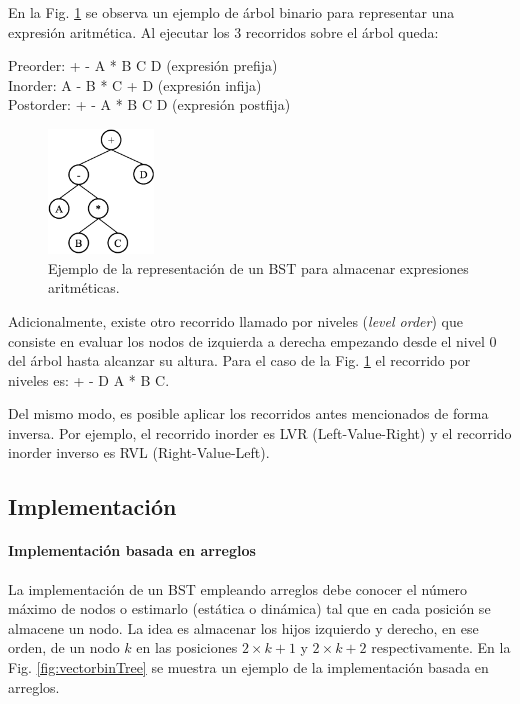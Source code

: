 En la Fig. \ref{fig:bintreeExpresion} se observa un ejemplo de árbol binario para representar una expresión aritmética. Al ejecutar los 3 recorridos sobre el árbol queda:

Preorder: + - A * B C D (expresión prefija) \\
Inorder: A - B * C + D (expresión infija) \\
Postorder: + - A * B C D (expresión postfija) \\

\begin{figure}[htpb!]
  \begin{center}
    \includegraphics[width=0.25\textwidth]{images/bintreeExpresion.eps}
  \end{center}
  \caption{Ejemplo de la representación de un BST para almacenar expresiones aritméticas.}
  \label{fig:bintreeExpresion}
\end{figure}

Adicionalmente, existe otro recorrido llamado por niveles (\textit{level order}) que consiste en evaluar los nodos de izquierda a derecha empezando desde el nivel 0 del árbol hasta alcanzar su altura. Para el caso de la Fig. \ref{fig:bintreeExpresion} el recorrido por niveles es: + - D A * B C.

Del mismo modo, es posible aplicar los recorridos antes mencionados de forma inversa. Por ejemplo, el recorrido inorder es LVR (Left-Value-Right) y el recorrido inorder inverso es RVL (Right-Value-Left).


\subsection{Implementación} \label{lb:treearray}

\paragraph{Implementación basada en arreglos}

La implementación de un BST empleando arreglos debe conocer el número máximo de nodos o estimarlo (estática o dinámica) tal que en cada posición se almacene un nodo. La idea es almacenar los hijos izquierdo y derecho, en ese orden, de un nodo $k$ en las posiciones $2 \times k + 1$ y $2 \times k + 2$ respectivamente. En la Fig. \ref{fig:vectorbinTree} se muestra un ejemplo de la implementación basada en arreglos.

